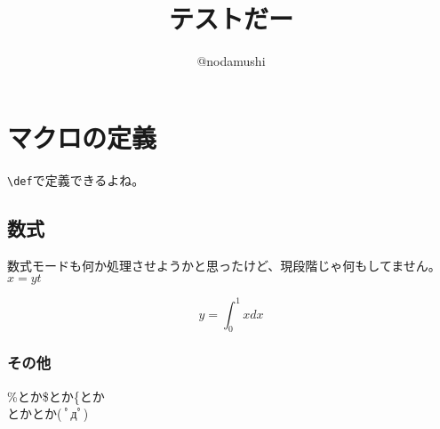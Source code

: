 \documentclass[4a]{jsarticle}
\author{@nodamushi}
\title{テストだー}
\begin{document}
\maketitle

\section{マクロの定義}
\verb+\def+で定義できるよね。

\def\macro{\iftrue TRUE! \else FALSE! \fi}

\subsection{数式}
数式モードも何か処理させようかと思ったけど、現段階じゃ何もしてません。
$x = yt$

\[
y = \int_0^1 x dx
\]

\subsubsection{その他}
\%とか\$とか\{とか\\とかとか( ﾟдﾟ)
\end{document}
